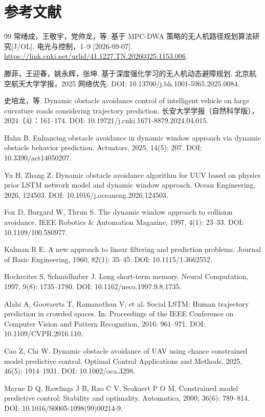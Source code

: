 \documentclass[11pt,a4paper]{ctexart}
\begin{document}
\section*{参考文献}
\begin{thebibliography}{99}
 常绪成，王敬宇，党帅龙，等. 基于 MPC-DWA 策略的无人机路径规划算法研究[J/OL]. 电光与控制，1–9 [2026-09-07]. \url{https://link.cnki.net/urlid/41.1227.TN.20260325.1153.006}.

 滕菲，王迎春，姚永辉，张坤. 基于深度强化学习的无人机动态避障规划. 北京航空航天大学学报，2025 网络优先. DOI: 10.13700/j.bh.1001-5965.2025.0084.

 史培龙，等. Dynamic obstacle avoidance control of intelligent vehicle on large curvature roads considering trajectory prediction. 长安大学学报（自然科学版），2024（4）：161–174. DOI: 10.19721/j.cnki.1671-8879.2024.04.015.

 Hahn B. Enhancing obstacle avoidance in dynamic window approach via dynamic obstacle behavior prediction. Actuators, 2025, 14(5): 207. DOI: 10.3390/act14050207.

 Yu H, Zhang Z. Dynamic obstacle avoidance algorithm for UUV based on physics prior LSTM network model and dynamic window approach. Ocean Engineering, 2026, 124503. DOI: 10.1016/j.oceaneng.2026.124503.

 Fox D, Burgard W, Thrun S. The dynamic window approach to collision avoidance. IEEE Robotics \& Automation Magazine, 1997, 4(1): 23–33. DOI: 10.1109/100.580977.

 Kalman R E. A new approach to linear filtering and prediction problems. Journal of Basic Engineering, 1960, 82(1): 35–45. DOI: 10.1115/1.3662552.

 Hochreiter S, Schmidhuber J. Long short-term memory. Neural Computation, 1997, 9(8): 1735–1780. DOI: 10.1162/neco.1997.9.8.1735.

 Alahi A, Goovaerts T, Ramanathan V, et al. Social LSTM: Human trajectory prediction in crowded spaces. In: Proceedings of the IEEE Conference on Computer Vision and Pattern Recognition, 2016: 961–971. DOI: 10.1109/CVPR.2016.110.

 Cao Z, Chi W. Dynamic obstacle avoidance of UAV using chance constrained model predictive control. Optimal Control Applications and Methods, 2025, 46(5): 1914–1931. DOI: 10.1002/oca.3298.

 Mayne D Q, Rawlings J B, Rao C V, Scokaert P O M. Constrained model predictive control: Stability and optimality. Automatica, 2000, 36(6): 789–814. DOI: 10.1016/S0005-1098(99)00214-9.


\end{thebibliography}
\end{document}

